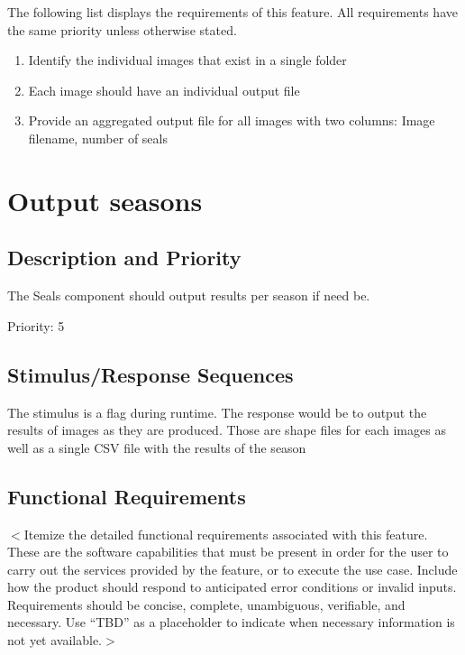 \documentclass{scrreprt}
\begin{document}
The following list displays the requirements of this feature. All requirements
have the same priority unless otherwise stated. 


\begin{enumerate}[REQ-1:]
\item Identify the individual images that exist in a single folder
\item Each image should have an individual output file
\item Provide an aggregated output file for all images with two columns: Image 
filename, number of seals
\end{enumerate}

\section{Output seasons}

\subsection{Description and Priority}

The Seals component should output results per season if need be.

Priority: 5

\subsection{Stimulus/Response Sequences}

The stimulus is a flag during runtime. The response would be to output the
results of images as they are produced. Those are shape files for each images
as well as a single CSV file with the results of the season

\subsection{Functional Requirements}
\iffalse
$<$Itemize the detailed functional requirements associated with this feature.  
These are the software capabilities that must be present in order for the user 
to carry out the services provided by the feature, or to execute the use case.  
Include how the product should respond to anticipated error conditions or 
invalid inputs. Requirements should be concise, complete, unambiguous, 
verifiable, and necessary. Use “TBD” as a placeholder to indicate when necessary 
information is not yet available.$>$
\end{document}
